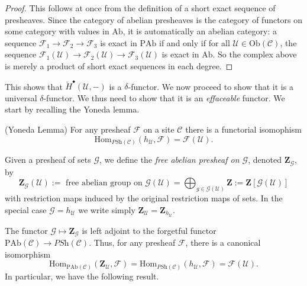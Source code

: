 \begin{proof}
This follows at once from the definition of a short exact sequence of
presheaves. Since the category of abelian presheaves is the category of
functors on some category with values in $\text{Ab}$, it is automatically an
abelian category: a sequence $\mathcal{F}_1\to \mathcal{F}_2\to \mathcal{F}_3$
is exact in $\text{PAb}$ if and only if for all $\mathcal{U}\in
\text{Ob}(\mathcal{C})$, the sequence $\mathcal{F}_1(\mathcal{U})\to
\mathcal{F}_2(\mathcal{U})\to \mathcal{F}_3(\mathcal{U})$ is exact in
$\text{Ab}$. So the complex above is merely a product of short exact sequences
in each degree.
\end{proof}

\noindent
This shows that $\check{H}^\bullet(\mathcal{U}, -)$ is a $\delta$-functor.
We now proceed to show that it is a universal $\delta$-functor. We thus need to
show that it is an {\it effaceable} functor. We start by recalling the Yoneda
lemma.

\begin{lemma}
\label{lemma-yoneda-presheaf}
(Yoneda Lemma)
For any presheaf $\mathcal{F}$ on a site $\mathcal{C}$ there is a
functorial isomophism
$$
\text{Hom}_{\textit{PSh}(\mathcal{C})} (h_{\mathcal{U}}, \mathcal{F}) =
\mathcal{F}(\mathcal{U}).
$$
\end{lemma}

\begin{definition}
\label{definition-free-abelian-presheaf}
Given a presheaf of sets $\mathcal{G}$, we define the
{\it free abelian presheaf on $\mathcal{G}$},
denoted $\mathbf{Z}_{\mathcal{G}}$, by
$$
\mathbf{Z}_{\mathcal{G}}(\mathcal{U})
:=
\text{ free abelian group on }\mathcal{G}(\mathcal{U})
=
\bigoplus_{g\in \mathcal{G}(\mathcal{U})}\mathbf{Z}
:=
\mathbf{Z}\left[\mathcal{G}(\mathcal{U})\right]
$$
with restriction maps induced by the original restriction maps of sets. In
the special case $\mathcal{G} = h_\mathcal{U}$ we write simply
$\mathbf{Z}_\mathcal{U} = \mathbf{Z}_{h_\mathcal{U}}$.
\end{definition}

\noindent
The functor $\mathcal{G} \mapsto \mathbf{Z}_\mathcal{G}$ is left adjoint to
the forgetful functor $\text{PAb}(\mathcal{C}) \to \textit{PSh}(\mathcal{C})$.
Thus, for any presheaf $\mathcal{F}$, there is a canonical isomorphism
$$
\text{Hom}_{\text{PAb}(\mathcal{C})}\left(
\mathbf{Z}_\mathcal{U}, \mathcal{F}
\right)
=
\text{Hom}_{\textit{PSh}(\mathcal{C})}(h_\mathcal{U}, \mathcal{F})
=
\mathcal{F}(\mathcal{U}).
$$
In particular, we have the following result.

